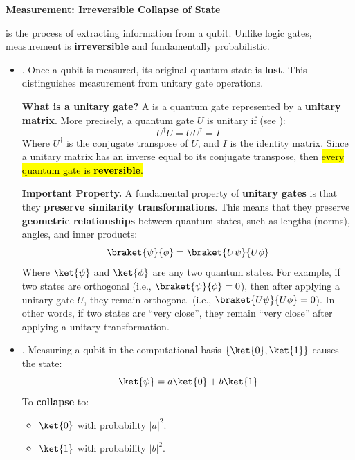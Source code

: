 \highspace
\begin{flushleft}
    \textcolor{Green3}{ \textbf{Measurement: Irreversible Collapse of State}}
\end{flushleft}
 is the process of extracting information from a qubit. Unlike logic gates, measurement is \textbf{irreversible} and fundamentally probabilistic.
\begin{itemize}\label{def:unitary-gate}
    \item {}. Once a qubit is measured, its original quantum state is \textbf{lost}. This distinguishes measurement from unitary gate operations.
    
    \textcolor{Green3}{ \textbf{What is a unitary gate?}} A  is a quantum gate represented by a \textbf{unitary matrix}. More precisely, a quantum gate $U$ is unitary if (see ):
    \begin{equation*}
        U^\dagger U = U U^\dagger = I
    \end{equation*}
    Where $U^\dagger$ is the conjugate transpose of $U$, and $I$ is the identity matrix. Since a unitary matrix has an inverse equal to its conjugate transpose, then \hl{every quantum gate is \textbf{reversible}.}

    \textcolor{Red2}{ \textbf{Important Property.}} A fundamental property of \textbf{unitary gates} is that they \textbf{preserve similarity transformations}. This means that they preserve \textbf{geometric relationships} between quantum states, such as lengths (norms), angles, and inner products:
    \begin{equation}
        \braket{\psi}{\phi} = \braket{U\psi}{U\phi}
    \end{equation}
    Where $\ket{\psi}$ and $\ket{\phi}$ are any two quantum states. For example, if two states are orthogonal (i.e., $\braket{\psi}{\phi} = 0$), then after applying a unitary gate $U$, they remain orthogonal (i.e., $\braket{U\psi}{U\phi} = 0$). In other words, if two states are ``very close'', they remain ``very close'' after applying a unitary transformation.
    
    
    \item {}. Measuring a qubit in the computational basis $\left\{\ket{0}, \ket{1}\right\}$ causes the state:
    \begin{equation*}
        \ket{\psi} = a\ket{0} + b\ket{1}
    \end{equation*}
    To \textbf{collapse} to:
    \begin{itemize}
        \item $\ket{0}$ with probability $\left|a\right|^2$.
        \item $\ket{1}$ with probability $\left|b\right|^2$.
    \end{itemize}
    

\end{itemize}
